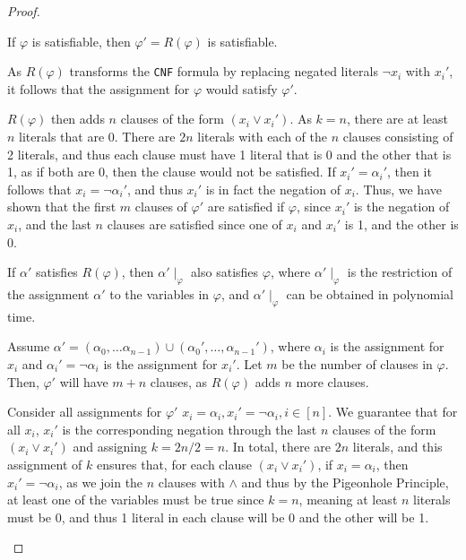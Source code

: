 \documentclass[11pt]{scrartcl}
\theoremstyle{dotlessP}
\theoremstyle{dotlessN}
\newcommand{\unite}{\cup}
\begin{document}
\begin{enumerate}[(a)]
\begin{proof}
\begin{enumerate}[1.]
		\begin{claim*}
			If $\varphi$ is satisfiable, then $\varphi' = R(\varphi)$ is satisfiable.
		\end{claim*}
		\begin{subproof}

			As $R(\varphi)$ transforms the \texttt{CNF} formula by replacing negated literals $\neg x_i$ with $x_i'$, it follows that the assignment for $\varphi$ would satisfy $\varphi'$. 

			$R(\varphi)$ then adds $n$ clauses of the form $(x_i \lor x_i')$. As $k = n$, there are at least $n$ literals that are 0. There are $2n$ literals with each of the $n$ clauses consisting of 2 literals, and thus each clause must have 1 literal that is 0 and the other that is 1, as if both are 0, then the clause would not be satisfied. If $x_i' = \alpha_i'$, then it follows that  $x_i = \neg \alpha_i'$, and thus $x_i'$ is in fact the negation of $x_i$. Thus, we have shown that the first $m$ clauses of $\varphi'$ are satisfied if $\varphi$, since $x_i'$ is the negation of $x_i$, and the last $n$ clauses are satisfied since one of $x_i$ and $x_i'$ is 1, and the other is 0.
		\end{subproof}
		\begin{claim*}
			If $\alpha'$ satisfies $R(\varphi)$, then $\alpha' \mid_\varphi$ also satisfies $\varphi$, where $\alpha' \mid_\varphi$ is the restriction of the assignment $\alpha'$ to the variables in $\varphi$, and $\alpha' \mid_\varphi$ can be obtained in polynomial time.
		\end{claim*}
		\begin{subproof}
			Assume $\alpha' = (\alpha_0, \dots \alpha_{n-1}) \unite (\alpha_0', \dots, \alpha_{n-1}')$, where $\alpha_i$ is the assignment for $x_i$ and $\alpha_i' = \neg \alpha_i$ is the assignment for $x_i'$. Let $m$ be the number of clauses in $\varphi$. Then, $\varphi'$ will have $m + n$ clauses, as $R(\varphi)$ adds $n$ more clauses.
		
			Consider all assignments for $\varphi'$ $x_i = \alpha_i, x_i' = \neg \alpha_i, i \in [n]$. We guarantee that for all $x_i$, $x_i'$ is the corresponding negation through the last $n$ clauses of the form $(x_i \lor x_i')$ and assigning $k = 2n/2 = n$. In total, there are $2n$ literals, and this assignment of $k$ ensures that, for each clause $(x_i \lor x_i')$, if $x_i = \alpha_i$, then $x_i' = \neg\alpha_i$, as we join the $n$ clauses with $\land$ and thus by the Pigeonhole Principle, at least one of the variables must be true since $k = n$, meaning at least $n$ literals must be 0, and thus 1 literal in each clause will be 0 and the other will be 1.


\end{subproof}
\end{enumerate}
\end{proof}
\end{enumerate}
\end{document}
